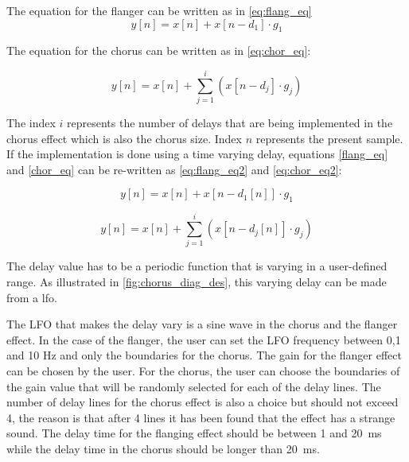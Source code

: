 The equation for the flanger can be written as in \autoref{eq:flang_eq}
\begin{equation}
\label{eq:flang_eq}
		y[n] = x[n] + x[n- d_{1}] \cdot g_{1}  
\end{equation}

The equation for the chorus can be written as in \autoref{eq:chor_eq}:

\begin{equation}
\label{eq:chor_eq}
y[n] = x[n] + \sum_{j=1}^{i}  (x[n- d_{j}] \cdot g_{j})
\end{equation}

The index $i$ represents the number of delays that are being implemented in the chorus effect which is also the chorus size. Index $n$ represents the present sample. \\
If the implementation is done using a time varying delay, equations \ref{flang_eq} and \ref{chor_eq} can be re-written as \autoref{eq:flang_eq2} and \autoref{eq:chor_eq2}:

\begin{equation}
\label{eq:flang_eq2}
y[n] = x[n] + x[n- d_{1}[n]] \cdot g_{1}  
\end{equation}

\begin{equation}
\label{eq:chor_eq2}
y[n] = x[n] + \sum_{j=1}^{i}  (x[n- d_{j}[n]] \cdot g_{j})
\end{equation}

The delay value has to be a periodic function that is varying in a user-defined range. As illustrated in \autoref{fig:chorus_diag_des}, this varying delay can be made from a \gls{lfo}.

The LFO that makes the delay vary is a sine wave in the chorus and the flanger effect. In the case of the flanger, the user can set the LFO frequency between 0,1 and 10 Hz and only the boundaries for the chorus. 
The gain for the flanger effect can be chosen by the user. For the chorus, the user can choose the boundaries of the gain value that will be randomly selected for each of the delay lines. 
The number of delay lines for the chorus effect is also a choice but should not exceed 4, the reason is that after 4 lines it has been found that the effect has a strange sound. 
The delay time for the flanging effect should be between 1 and \SI{20}{\milli\second} while the delay time in the chorus should be longer than \SI{20}{\milli\second}. 


